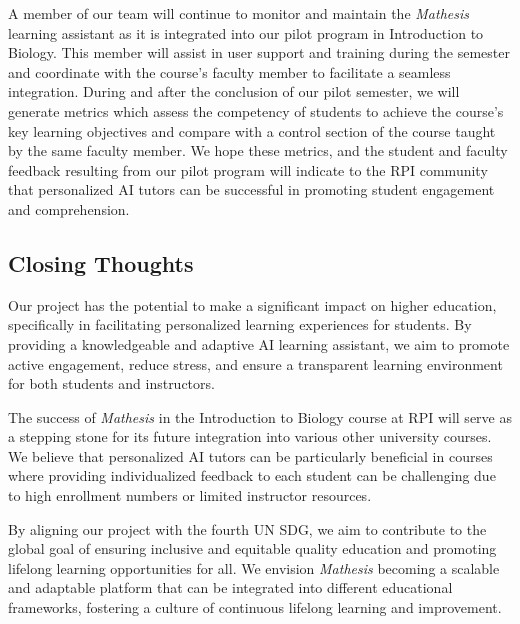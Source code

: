 \documentclass[12pt,a4paper]{article}
\begin{document}
    A member of our team will continue to monitor and maintain the \textit{Mathesis} learning assistant as it
    is integrated into our pilot program in Introduction to Biology. This member will assist in user
    support and training during the semester and coordinate with the course’s faculty member to
    facilitate a seamless integration. During and after the conclusion of our pilot semester, we will
    generate metrics which assess the competency of students to achieve the course’s key learning
    objectives and compare with a control section of the course taught by the same faculty member.
    We hope these metrics, and the student and faculty feedback resulting from our pilot program will
    indicate to the RPI community that personalized AI tutors can be successful in promoting student
    engagement and comprehension.

    \subsection{Closing Thoughts}
    Our project has the potential to make a significant impact on higher education, specifically in
    facilitating personalized learning experiences for students. By providing a knowledgeable and
    adaptive AI learning assistant, we aim to promote active engagement, reduce stress, and ensure a
    transparent learning environment for both students and instructors.

    The success of \textit{Mathesis} in the Introduction to Biology course at RPI will serve as a
    stepping stone for its future integration into various other university courses. We believe that
    personalized AI tutors can be particularly beneficial in courses where providing individualized
    feedback to each student can be challenging due to high enrollment numbers or limited instructor
    resources.

    By aligning our project with the fourth UN SDG, we aim to contribute to the global goal of
    ensuring inclusive and equitable quality education and promoting lifelong learning opportunities for
    all. We envision \textit{Mathesis} becoming a scalable and adaptable platform that can be integrated
    into different educational frameworks, fostering a culture of continuous lifelong learning and improvement.

    \pagebreak
    
    
    
\end{document}
